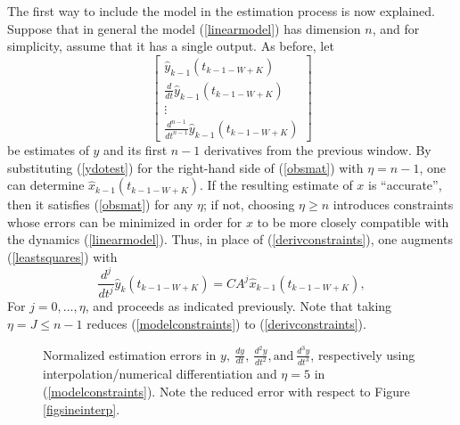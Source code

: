 The first way to include the model in the estimation process is now
explained.  Suppose that in general the model (\ref{linearmodel}) has dimension
$n$, and for simplicity, assume that it has a single output.
As before, let
\begin{equation}
\left[ \begin{array}{r} 
\hat{y}_{k-1}(t_{k-1-W+K}) \\
\frac{d}{dt} \hat{y}_{k-1}(t_{k-1-W+K}) \\ 
\vdots \\ 
\frac{d^{n-1}}{dt^{n-1}} \hat{y}_{k-1}(t_{k-1-W+K})
\end{array} \right]
\label{ydotest}
\end{equation}
be estimates of $y$ and its first $n-1$ derivatives from the previous window.
By substituting (\ref{ydotest}) for the right-hand side of (\ref{obsmat}) with
$\eta = n-1$, one can
determine $\hat{x}_{k-1}(t_{k-1-W+K})$. 
If the resulting estimate of $x$ is ``accurate'', then it satisfies (\ref{obsmat}) for
any $\eta$; if not, choosing $\eta \ge n$ introduces constraints whose
errors can be minimized in order for $x$ to be more closely compatible
with the dynamics (\ref{linearmodel}).  Thus, in place of
(\ref{derivconstraints}),
one augments (\ref{leastsquares}) with
\begin{equation}
\frac{d^j}{dt^j} \hat{y}_k(t_{k-1-W+K}) = CA^j  \hat{x}_{k-1}(t_{k-1-W+K}),
\label{modelconstraints}
\end{equation}
For $j=0, \ldots, \eta$, and proceeds as indicated previously.  
Note that taking $\eta =J \le n-1$ reduces 
(\ref{modelconstraints}) to (\ref{derivconstraints}).



\begin{figure}[hbt]
\centerline{}
\smallskip
\caption{ Normalized estimation errors in $y, \ \frac{dy}{dt}, \
\frac{d^2y}{dt^2}, \mbox{and} \
\frac{d^3y}{dt^3}$, respectively using interpolation/numerical differentiation
and $\eta=5$ in (\protect\ref{modelconstraints}).  Note the reduced error with respect to
Figure \protect\ref{figsineinterp}. }
\label{figsinesplineorder5}
\end{figure}


